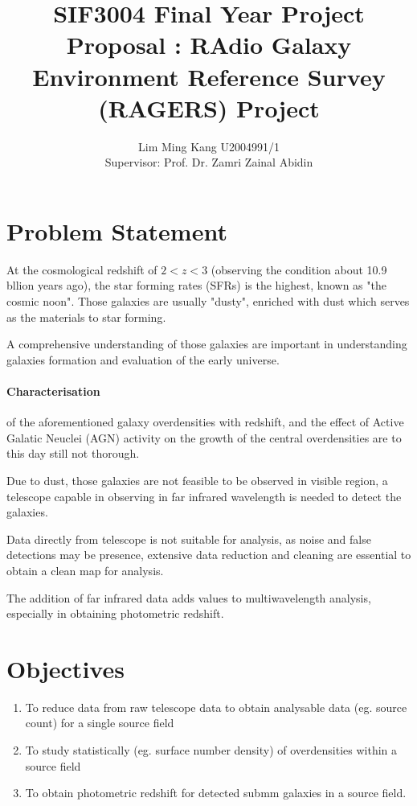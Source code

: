 \documentclass{article}
\title{SIF3004 Final Year Project Proposal : RAdio Galaxy Environment Reference Survey (RAGERS) Project }
\author{Lim Ming Kang U2004991/1\\[0.3cm]{Supervisor: Prof. Dr. Zamri Zainal Abidin}}
\begin{document}
\maketitle
\section{Problem Statement}

At the cosmological redshift of $2 < z < 3$ (observing the condition about 10.9 bllion years ago), the star forming rates (SFRs) is the highest, known as "the cosmic noon"\cite{Schreiber2020}.
Those galaxies are usually "dusty", enriched with dust which serves as the materials to star forming.
\medskip

\noindent A comprehensive understanding of those galaxies are important in understanding galaxies formation and evaluation of the early universe.\cite{Geach2016}


\paragraph{Characterisation} of the aforementioned galaxy overdensities with redshift, and the effect of Active Galatic Neuclei (AGN) activity on the growth of the central overdensities are to this day still not thorough.\cite{Ragers2021}
\medskip

\noindent Due to dust, those galaxies are not feasible to be observed in visible region, a telescope capable in observing in far infrared wavelength is needed to detect the galaxies.
\medskip

\noindent Data directly from telescope is not suitable for analysis, as noise and false detections may be presence, extensive data reduction and cleaning are essential to obtain a clean map for analysis. 
\medskip

\noindent The addition of far infrared data adds values to multiwavelength analysis, especially in obtaining photometric redshift.

\section{Objectives}
\begin{enumerate}
    \item To reduce data from raw telescope data to obtain analysable data (eg. source count) for a single source field
    \item To study statistically (eg. surface number density) of overdensities within a source field
    \item To obtain photometric redshift for detected submm galaxies in a source field.
\end{enumerate}
\end{document}
